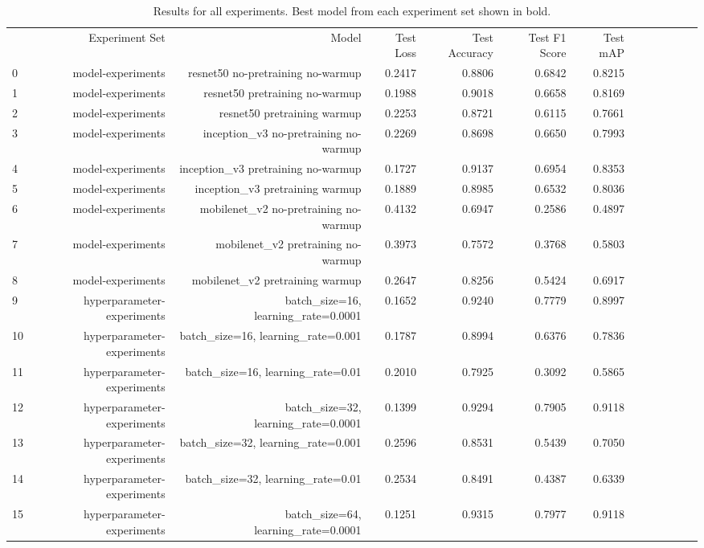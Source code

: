 \begin{table}[h!]
\caption{Results for all experiments. Best model from each experiment set shown in bold.}
\label{tab:all\_results}
\begin{tabular}{lrrrrrrrrrrrr}
 & Experiment Set & Model & Test Loss & Test Accuracy & Test F1 Score & Test mAP \\
0 & model-experiments & resnet50 no-pretraining no-warmup & 0.2417 & 0.8806 & 0.6842 & 0.8215 \\
1 & model-experiments & resnet50 pretraining no-warmup & 0.1988 & 0.9018 & 0.6658 & 0.8169 \\
2 & model-experiments & resnet50 pretraining warmup & 0.2253 & 0.8721 & 0.6115 & 0.7661 \\
3 & model-experiments & inception\_v3 no-pretraining no-warmup & 0.2269 & 0.8698 & 0.6650 & 0.7993 \\
4 & model-experiments & inception\_v3 pretraining no-warmup & 0.1727 & 0.9137 & 0.6954 & 0.8353 \\
5 & model-experiments & inception\_v3 pretraining warmup & 0.1889 & 0.8985 & 0.6532 & 0.8036 \\
6 & model-experiments & mobilenet\_v2 no-pretraining no-warmup & 0.4132 & 0.6947 & 0.2586 & 0.4897 \\
7 & model-experiments & mobilenet\_v2 pretraining no-warmup & 0.3973 & 0.7572 & 0.3768 & 0.5803 \\
8 & model-experiments & mobilenet\_v2 pretraining warmup & 0.2647 & 0.8256 & 0.5424 & 0.6917 \\
9 & hyperparameter-experiments & batch\_size=16, learning\_rate=0.0001 & 0.1652 & 0.9240 & 0.7779 & 0.8997 \\
10 & hyperparameter-experiments & batch\_size=16, learning\_rate=0.001 & 0.1787 & 0.8994 & 0.6376 & 0.7836 \\
11 & hyperparameter-experiments & batch\_size=16, learning\_rate=0.01 & 0.2010 & 0.7925 & 0.3092 & 0.5865 \\
12 & hyperparameter-experiments & batch\_size=32, learning\_rate=0.0001 & 0.1399 & 0.9294 & 0.7905 & 0.9118 \\
13 & hyperparameter-experiments & batch\_size=32, learning\_rate=0.001 & 0.2596 & 0.8531 & 0.5439 & 0.7050 \\
14 & hyperparameter-experiments & batch\_size=32, learning\_rate=0.01 & 0.2534 & 0.8491 & 0.4387 & 0.6339 \\
15 & hyperparameter-experiments & batch\_size=64, learning\_rate=0.0001 & 0.1251 & 0.9315 & 0.7977 & 0.9118 \\

\end{tabular}
\end{table}
